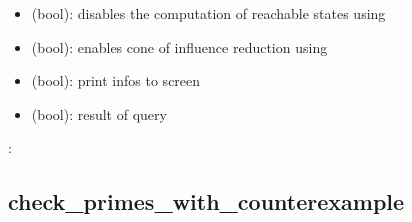 \documentclass[letterpaper,10pt,english]{sphinxmanual}
\begin{document}
\begin{fulllineitems}
\begin{description}
\begin{itemize}
\item {} 
 (bool): disables the computation of reachable states using 

\item {} 
 (bool): enables cone of influence reduction using 

\item {} 
 (bool): print infos to screen

\end{itemize}

\item[{\sphinxstylestrong{returns}:}] \leavevmode\begin{itemize}
\item {} 
 (bool): result of query

\end{itemize}

\end{description}

:

\begin{sphinxVerbatim}[commandchars=\\\{\}]
  
  
  
   
\end{sphinxVerbatim}

\end{fulllineitems}



\subsection{check\_primes\_with\_counterexample}
\label{\detokenize{ModelChecking:check-primes-with-counterexample}}\label{\detokenize{ModelChecking:id3}}
\end{document}
